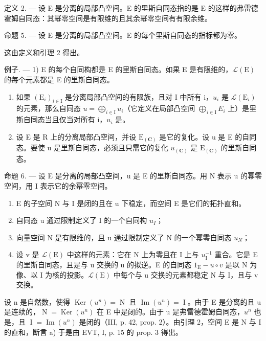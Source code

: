 定义 2. --- 设 E 是分离的局部凸空间。E 的里斯自同态指的是 E 的这样的弗雷德霍姆自同态：其幂零空间是有限维的且其余幂零空间有有限余维。

命题 5. --- 设 E 是分离的局部凸空间。E 的每个里斯自同态的指标都为零。

这由定义和引理 2 得出。

例子. --- 1) E 的每个自同构都是 E 的里斯自同态。如果 E 是有限维的，\(\mathcal{L}(\mathrm{E})\) 的每个元素都是 E 的里斯自同态。

\begin{enumerate}
\def\labelenumi{\arabic{enumi})}
\setcounter{enumi}{1}
\item
   如果 \((\mathrm{E}_{i})_{i\in\mathrm{I}}\) 是分离局部凸空间的有限族，且对 I 中所有 i，\(u_{i}\) 是 \(\mathcal{L}(\mathrm{E}_{i})\) 的元素，那么自同态 \(u=\bigoplus_{i\in\mathrm{I}}u_{i}\)（它定义在局部凸空间 \(\bigoplus_{i\in\mathrm{I}}E_{i}\) 上）是里斯自同态当且仅当对所有 i，\(u_{i}\) 是。
\item
   设 E 是 R 上的分离局部凸空间，并设 \(\mathrm{E}_{(\mathbf{C})}\) 是它的复化。设 u 是 E 的自同态。要使 u 是里斯自同态，必须且只需它的复化 \(u_{(\mathbf{C})}\) 是 \(\mathrm{E}_{(\mathbf{C})}\) 的里斯自同态。
\end{enumerate}

命题 6. --- 设 E 是分离的局部凸空间，u 是 E 的里斯自同态。用 N 表示 u 的幂零空间，用 I 表示它的余幂零空间。

\begin{enumerate}
\def\labelenumi{\alph{enumi})}
\item
  E 的子空间 N 与 I 是闭的且在 u 下稳定，而空间 E 是它们的拓扑直和。
\item
  自同态 u 通过限制定义了 I 的一个自同构 \(u_{I}\)；
\item
   向量空间 N 是有限维的，且 u 通过限制定义了 N 的一个幂零自同态 \(u_{N}\)；
\item
  设 v 是 \(\mathcal{L}(\mathrm{E})\) 中这样的元素：它在 N 上为零且在 I 上与 \(u_{\mathrm{I}}^{-1}\) 重合。它是 E 的里斯自同态，且是与 u 交换的 u 的拟逆。E 的自同态 \(1_{\mathrm{E}} - u \circ v\) 是以 N 为像、以 I 为核的投影。\(\mathcal{L}(\mathrm{E})\) 中每个与 u 交换的元素都稳定 N 与 I，且与 v 交换。
\end{enumerate}

设 n 是自然数，使得 \(\operatorname{Ker}(u^{n}) = \operatorname{N}\) 且 \(\operatorname{Im}(u^{n}) = \operatorname{I}\)。由于 E 是分离的且 u 是连续的，\(\operatorname{N} = \operatorname{Ker}(u^{n})\) 在 E 中是闭的。由于 u 是弗雷德霍姆自同态，\(u^{n}\) 也是，且 \(\operatorname{I} = \operatorname{Im}(u^{n})\) 是闭的（III, p. 42, prop. 2）。由引理 2，空间 E 是 N 与 I 的直和，断言 a) 于是由 EVT, I, p. 15 的 prop. 3 得出。

